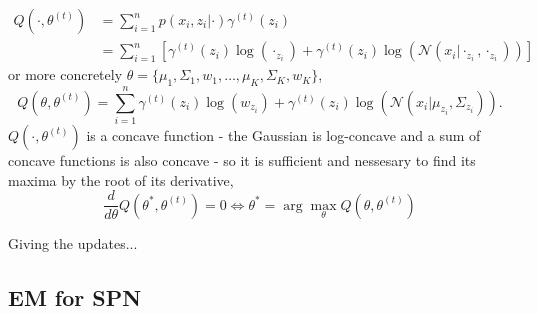 \begin{align*}
    Q(\cdot, \theta^{(t)}) &= \sum_{i=1}^n p(x_i,z_i|\cdot) \gamma^{(t)}(z_i) \\
    &= \sum_{i=1}^n \left[ \gamma^{(t)}(z_i) \log(\cdot_{z_i})+\gamma^{(t)}(z_i) 
    \log(\mathcal{N}(x_i| \cdot_{z_i} , \cdot_{z_i}))\right]
\end{align*}
or more concretely $\theta = \{\mu_1 , \Sigma_1,w_1, \dots, \mu_K , \Sigma_K, w_K\}$, 
$$ Q(\theta, \theta^{(t)}) = \sum_{i=1}^n \gamma^{(t)}(z_i) \log(w_{z_i})+\gamma^{(t)}(z_i) \log(\mathcal{N}(x_i| \mu_{z_i} , \Sigma_{z_i})).$$
$Q(\cdot, \theta^{(t)})$ is a concave function - the Gaussian is log-concave and a sum of concave functions is 
also concave - so it is sufficient and nessesary to find its maxima by the root of its derivative, 
$$\frac{d}{d \theta} Q(\theta^*, \theta^{(t)}) = 0 \iff \theta^* = \arg\max_{\theta} Q(\theta, \theta^{(t)})$$

Giving the updates...

\subsection*{EM for SPN}



